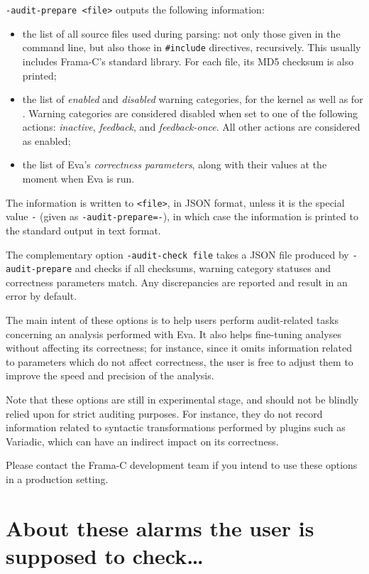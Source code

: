 \documentclass{frama-c-book}
\begin{document}
\lstinline|-audit-prepare <file>| outputs the following information:

\begin{itemize}
\item the list of all source files used during parsing: not only those
  given in the command line, but also those in \lstinline|#include|
  directives, recursively. This usually includes Frama-C's standard library.
  For each file, its MD5 checksum is also printed;
\item the list of {\em enabled} and {\em disabled} warning categories,
  for the kernel as well as for \Eva{}. Warning categories are considered
  disabled when set to one of the following actions: {\em inactive},
  {\em feedback}, and {\em feedback-once}. All other actions are considered
  as enabled;
\item the list of Eva's {\em correctness parameters}, along with their values
  at the moment when Eva is run.
\end{itemize}

The information is written to \lstinline|<file>|, in JSON format, unless it
is the special value \lstinline|-| (given as \lstinline|-audit-prepare=-|),
in which case the information is printed to the standard output in text format.

The complementary option \lstinline|-audit-check file| takes a JSON file
produced by \lstinline|-audit-prepare| and checks if all checksums, warning
category statuses and correctness parameters match. Any discrepancies are
reported and result in an error by default.

The main intent of these options is to help users perform audit-related
tasks concerning an analysis performed with Eva. It also helps fine-tuning
analyses without affecting its correctness; for instance, since it omits
information related to parameters which do not affect correctness, the user
is free to adjust them to improve the speed and precision of the analysis.

Note that these options are still in experimental stage, and should not be
blindly relied upon for strict auditing purposes. For instance, they do
not record information related to syntactic transformations performed by
plugins such as \textsf{Variadic}, which can have an indirect impact on
its correctness.

Please contact the Frama-C development team if you intend to use these
options in a production setting.

\section{About these alarms the user is supposed to check\ldots}
\end{document}
